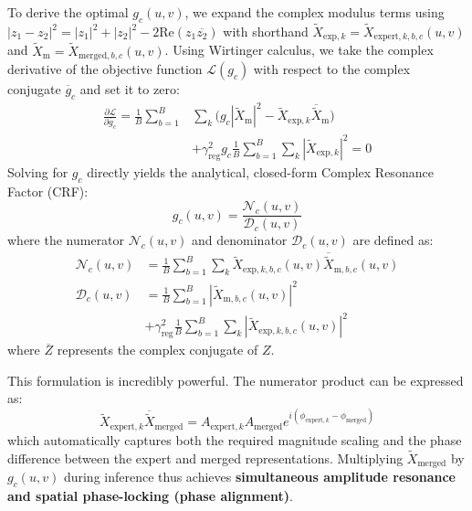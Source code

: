 \documentclass{article}
\theoremstyle{plain}
\theoremstyle{definition}
\theoremstyle{remark}
\begin{document}
To derive the optimal $g_c(u,v)$, we expand the complex modulus terms using $|z_1 - z_2|^2 = |z_1|^2 + |z_2|^2 - 2\text{Re}(z_1\overline{z_2})$ with shorthand $\tilde{X}_{\text{exp},k} = \tilde{X}_{\text{expert}, k, b, c}(u,v)$ and $\tilde{X}_{\text{m}} = \tilde{X}_{\text{merged}, b, c}(u,v)$. Using Wirtinger calculus, we take the complex derivative of the objective function $\mathcal{L}(g_c)$ with respect to the complex conjugate $\overline{g}_c$ and set it to zero:
\begin{align}
    \frac{\partial \mathcal{L}}{\partial \overline{g}_c} = \frac{1}{B}\sum_{b=1}^B &\sum_k \Big( g_c |\tilde{X}_{\text{m}}|^2 - \tilde{X}_{\text{exp},k} \overline{\tilde{X}}_{\text{m}} \Big) \nonumber \\
    &+ \gamma_{\text{reg}}^2 g_c \frac{1}{B}\sum_{b=1}^B \sum_k |\tilde{X}_{\text{exp},k}|^2 = 0
\end{align}
Solving for $g_c$ directly yields the analytical, closed-form Complex Resonance Factor (CRF):
\begin{equation}
    g_c(u, v) = \frac{\mathcal{N}_c(u, v)}{\mathcal{D}_c(u, v)}
\end{equation}
where the numerator $\mathcal{N}_c(u, v)$ and denominator $\mathcal{D}_c(u, v)$ are defined as:
\begin{align}
    \mathcal{N}_c(u, v) &= \frac{1}{B} \sum_{b=1}^B \sum_k \tilde{X}_{\text{exp}, k, b, c}(u, v) \overline{\tilde{X}}_{\text{m}, b, c}(u, v) \\
    \mathcal{D}_c(u, v) &= \frac{1}{B} \sum_{b=1}^B |\tilde{X}_{\text{m}, b, c}(u, v)|^2 \nonumber \\
    &+ \gamma_{\text{reg}}^2 \frac{1}{B} \sum_{b=1}^B \sum_k |\tilde{X}_{\text{exp}, k, b, c}(u, v)|^2
\end{align}
where $\overline{Z}$ represents the complex conjugate of $Z$.

This formulation is incredibly powerful. The numerator product can be expressed as:
\begin{equation}
    \tilde{X}_{\text{expert}, k} \overline{\tilde{X}}_{\text{merged}} = A_{\text{expert}, k} A_{\text{merged}} e^{i(\phi_{\text{expert}, k} - \phi_{\text{merged}})}
\end{equation}
which automatically captures both the required magnitude scaling and the phase difference between the expert and merged representations. Multiplying $\tilde{X}_{\text{merged}}$ by $g_c(u, v)$ during inference thus achieves \textbf{simultaneous amplitude resonance and spatial phase-locking (phase alignment)}.
\end{document}

